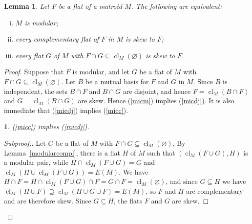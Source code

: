 \documentclass{amsart}
\theoremstyle{plain}
\newtheorem{claim}{}[theorem]
\newtheorem{lemma}[theorem]{Lemma}
\theoremstyle{definition}
\DeclareMathOperator{\cl}{cl}
\newcommand{\es}{\varnothing}
\renewcommand{\ss}{\subseteq}
\newcommand{\sps}{\supseteq}
\newenvironment{subproof}[1][\proofname]{%
  \renewcommand{\qedsymbol}{$\blacksquare$}%
  \begin{proof}[Subproof:]%
}{%
  \end{proof}%
}
\begin{document}
\begin{lemma}\label{modulariffcompl}
  Let $F$ be a flat of a matroid $M$. The following are equivalent: 
  \begin{enumerate}[(i)]
    \item\label{micm} $M$ is modular;
    \item\label{micc} every complementary flat of $F$ in $M$ is skew to $F$;
    \item\label{micdj} every flat $G$ of $M$ with $F \cap G \ss \cl_M(\es)$ is skew to $F$. 
  \end{enumerate}
\end{lemma}
\begin{proof}
  Suppose that $F$ is modular, and let $G$ be a flat of $M$ with $F \cap G \ss \cl_M(\es)$.
  Let $B$ be a mutual basis for $F$ and $G$ in $M$. 
  Since $B$ is independent, the sets $B \cap F$ and $B \cap G$ are disjoint, 
  and hence $F = \cl_M(B \cap F)$ and $G = \cl_M(B \cap G)$ are skew. 
  Hence (\ref{micm}) implies (\ref{micdj}). It is also immediate that (\ref{micdj}) implies (\ref{micc}). 
  

  \begin{claim}
    (\ref{micc}) implies (\ref{micdj}).
  \end{claim}
  \begin{subproof}
    Let $G$ be a flat of $M$ with $F \cap G \ss \cl_M(\es)$. 
    By Lemma~\ref{modularcompl}, there is a flat $H$ of $M$ such that $(\cl_M(F \cup G),H)$ is a modular pair, 
    while $H \cap \cl_M(F \cup G) = G$ and $\cl_M(H \cup \cl_M(F \cup G)) = E(M)$. 
    We have $H \cap F = H \cap \cl_M (F \cup G) \cap F = G \cap F = \cl_M(\es)$, 
    and since $G \ss H$ we have $\cl_M(H \cup F) \sps \cl_M(H \cup G \cup F) = E(M)$,
    so $F$ and $H$ are complementary and are therefore skew. Since $G \ss H$, the flats $F$ and $G$ are skew. 
  \end{subproof}


\end{proof}
\end{document}
